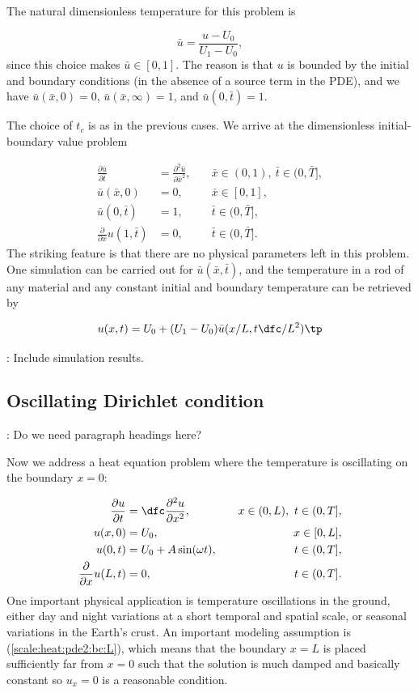 \documentclass[graybox,envcountchap,sectrefs,final]{svmonodo}
\newcommand{\shortinlinecomment}[3]{{\color{red}{\bf #1}: #2}}
\begin{document}
The natural dimensionless temperature for this problem is

\[ \bar u = \frac{u - U_0}{U_1 - U_0},\]
since this choice makes $\bar u\in [0,1]$. The reason is that $u$ is bounded by
the initial and boundary conditions (in the absence of a source term in
the PDE),
and we have
$\bar u(\bar x,0)=0$, $\bar u(\bar x,\infty)=1$, and $
\bar u(0,\bar t)=1$.

The choice of $t_c$ is as in the previous cases. We arrive at
the dimensionless initial-boundary value problem

\begin{align}
\frac{\partial \bar u}{\partial \bar t} &=
\frac{\partial^2 \bar u}{\partial \bar x^2},
\quad &  \bar x\in (0,1),\ \bar t\in (0, \bar T],
\label{scale:heat:pde3:d}\\ 
\bar u(\bar x,0) &= 0,
\quad & \bar x\in [0,1],
\label{scale:heat:pde3:ic:u:d}\\ 
\bar u(0, \bar t) & = 1,
\quad  & \bar t\in (0, \bar T],
\label{scale:heat:pde3:bc:0:d}\\ 
\frac{\partial}{\partial \bar x} u(1, \bar t) & = 0,
\quad & \bar t\in (0, \bar T].
\label{scale:heat:pde3:bc:L:d}
\end{align}
The striking feature is that there are no physical parameters left in
this problem. One simulation can be carried out for $\bar u(\bar x,\bar t)$,
and the temperature in a rod of any material and any constant initial and
boundary temperature can be retrieved by

\[ u(x,t) = U_0 + (U_1-U_0)\bar u(x/L, t\dfc/L^2)\tp\]

\shortinlinecomment{hpl 14}{ Include simulation results. }{ Include simulation results. }

\subsection{Oscillating Dirichlet condition}

\shortinlinecomment{hpl 15}{ Do we need paragraph headings here? }{ Do we need paragraph }

Now we address a heat equation problem where the temperature is
oscillating on the boundary $x=0$:

\begin{align}
\frac{\partial u}{\partial t} &=
\dfc \frac{\partial^2 u}{\partial x^2},
\quad &  x\in (0,L),\ t\in (0, T],
\label{scale:heat:pde2}\\ 
u(x,0) &= U_0,
\quad & x\in [0,L],
\label{scale:heat:pde2:ic:u}\\ 
u(0, t) & = U_0 + A\sin(\omega t),
\quad  & t\in (0, T],
\label{scale:heat:pde2:bc:0}\\ 
\frac{\partial}{\partial x} u(L, t) & = 0,
\quad & t\in (0, T].
\label{scale:heat:pde2:bc:L}
\end{align}
One important physical application is temperature oscillations in the
ground, either day and night variations
at a short temporal and spatial scale, or seasonal variations in the
Earth's crust.
An important modeling assumption is (\ref{scale:heat:pde2:bc:L}),
which means that the boundary $x=L$ is placed sufficiently far from $x=0$
such that the solution is much damped and basically constant so
$u_x=0$ is a reasonable condition.
\end{document}
